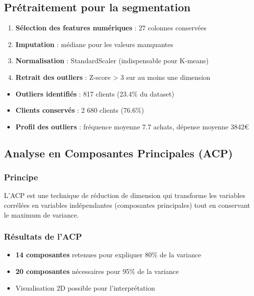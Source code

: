 \documentclass[11pt,a4paper]{article}
\begin{document}
\subsection{Prétraitement pour la segmentation}
\begin{enumerate}
    \item \textbf{Sélection des features numériques} : 27 colonnes conservées
    \item \textbf{Imputation} : médiane pour les valeurs manquantes
    \item \textbf{Normalisation} : StandardScaler (indispensable pour K-means)
    \item \textbf{Retrait des outliers} : Z-score > 3 sur au moins une dimension
\end{enumerate}

\begin{tcolorbox}[title=�� Outliers détectés]
\begin{itemize}
    \item \textbf{Outliers identifiés} : 817 clients (23.4\% du dataset)
    \item \textbf{Clients conservés} : 2 680 clients (76.6\%)
    \item \textbf{Profil des outliers} : fréquence moyenne 7.7 achats, dépense moyenne 3842€
\end{itemize}
\end{tcolorbox}

\subsection{Analyse en Composantes Principales (ACP)}

\subsubsection{Principe}
L'ACP est une technique de réduction de dimension qui transforme les variables 
corrélées en variables indépendantes (composantes principales) tout en conservant 
le maximum de variance.

\subsubsection{Résultats de l'ACP}
\begin{itemize}
    \item \textbf{14 composantes} retenues pour expliquer 80\% de la variance
    \item \textbf{20 composantes} nécessaires pour 95\% de la variance
    \item Visualisation 2D possible pour l'interprétation
\end{itemize}
\end{document}
